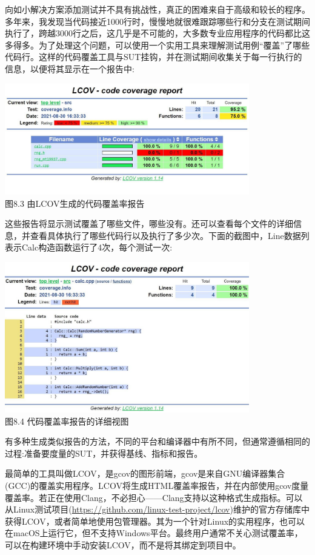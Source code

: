 

向如小解决方案添加测试并不具有挑战性，真正的困难来自于高级和较长的程序。多年来，我发现当代码接近1000行时，慢慢地就很难跟踪哪些行和分支在测试期间执行了，跨越3000行之后，这几乎是不可能的，大多数专业应用程序的代码都比这多得多。为了处理这个问题，可以使用一个实用工具来理解测试用例“覆盖”了哪些代码行。这样的代码覆盖工具与SUT挂钩，并在测试期间收集关于每一行执行的信息，以便将其显示在一个报告中:

\begin{center}
\includegraphics[width=0.8\textwidth]{content/3/chapter8/images/3.jpg}\\
图8.3 由LCOV生成的代码覆盖率报告
\end{center}

这些报告将显示测试覆盖了哪些文件，哪些没有。还可以查看每个文件的详细信息，并查看具体执行了哪些代码行以及执行了多少次。下面的截图中，Line数据列表示Calc构造函数运行了4次，每个测试一次:

\begin{center}
\includegraphics[width=0.8\textwidth]{content/3/chapter8/images/4.jpg}\\
图8.4 代码覆盖率报告的详细视图
\end{center}

有多种生成类似报告的方法，不同的平台和编译器中有所不同，但通常遵循相同的过程:准备要度量的SUT，并获得基线、指标和报告。

最简单的工具叫做LCOV，是gcov的图形前端，gcov是来自GNU编译器集合(GCC)的覆盖实用程序。LCOV将生成HTML覆盖率报告，并在内部使用gcov度量覆盖率。若正在使用Clang，不必担心——Clang支持以这种格式生成指标。可以从Linux测试项目(\url{https://github.com/linux-test-project/lcov})维护的官方存储库中获得LCOV，或者简单地使用包管理器。其为一个针对Linux的实用程序，也可以在macOS上运行它，但不支持Windows平台。最终用户通常不关心测试覆盖率，可以在构建环境中手动安装LCOV，而不是将其绑定到项目中。

